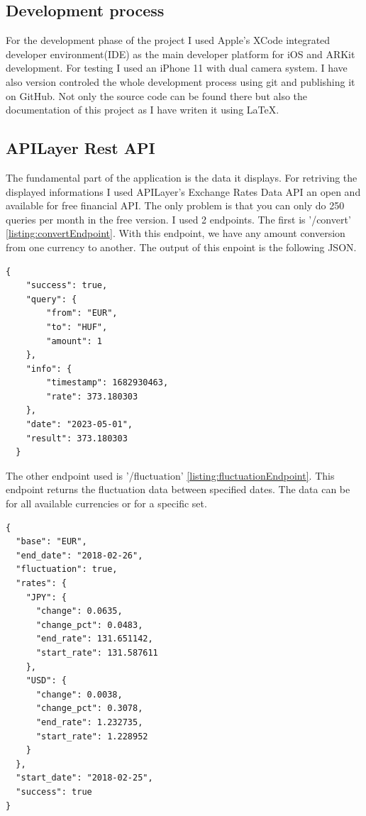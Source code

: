 \documentclass[a4paper,oneside]{article}
\begin{document}
\subsection{Development process}
For the development phase of the project I used Apple's XCode integrated developer environment(IDE) as the main developer platform for iOS and ARKit development. For testing I used an iPhone 11 with dual camera system.
I have also version controled the whole development process using git and publishing it on GitHub. Not only the source code can be found there but also the documentation of this project as I have writen it using \LaTeX{}.

\subsection{APILayer Rest API}

The fundamental part of the application is the data it displays. For retriving the displayed informations I used APILayer's Exchange Rates Data API an open and available for free financial API.  The only problem is that you can only do 250 queries per month in the free version. I used 2 endpoints. The first is '/convert' \ref{listing:convertEndpoint}. With this endpoint, we have any amount conversion from one currency to another. The output of this enpoint is the following JSON.

\begin{lstlisting}[frame=single,float=!ht,caption=JSON from /convert endpoint, label=listing:convertEndpoint]
  {
    "success": true,
    "query": {
        "from": "EUR",
        "to": "HUF",
        "amount": 1
    },
    "info": {
        "timestamp": 1682930463,
        "rate": 373.180303
    },
    "date": "2023-05-01",
    "result": 373.180303
  }
\end{lstlisting}

The other endpoint used is '/fluctuation' \ref{listing:fluctuationEndpoint}. This endpoint returns the fluctuation data between specified dates. The data can be for all available currencies or for a specific set.


\begin{lstlisting}[frame=single,float=!ht,caption=JSON from /fluctuation endpoint, label=listing:fluctuationEndpoint]
{
  "base": "EUR",
  "end_date": "2018-02-26",
  "fluctuation": true,
  "rates": {
    "JPY": {
      "change": 0.0635,
      "change_pct": 0.0483,
      "end_rate": 131.651142,
      "start_rate": 131.587611
    },
    "USD": {
      "change": 0.0038,
      "change_pct": 0.3078,
      "end_rate": 1.232735,
      "start_rate": 1.228952
    }
  },
  "start_date": "2018-02-25",
  "success": true
}
\end{lstlisting}
\end{document}
